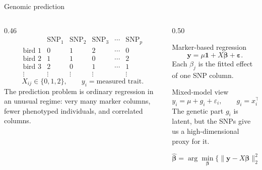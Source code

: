 \documentclass[aspectratio=169]{beamer}
\begin{document}
\begin{frame}{Genomic prediction}
  \begin{columns}[T,onlytextwidth]
    \begin{column}{0.46\textwidth}
      \[
      \begin{array}{c|ccccc}
       & \text{SNP}_1 & \text{SNP}_2 & \text{SNP}_3 & \cdots & \text{SNP}_p\\
      \hline
      \text{bird }1 & 0 & 1 & 2 & \cdots & 0\\
      \text{bird }2 & 1 & 1 & 0 & \cdots & 2\\
      \text{bird }3 & 2 & 0 & 1 & \cdots & 1\\
      \vdots & \vdots & \vdots & \vdots & & \vdots
      \end{array}
      \]
      \[
        X_{ij}\in\{0,1,2\}, \qquad y_i=\text{measured trait}.
      \]
      \small The prediction problem is ordinary regression in an unusual regime: very many marker columns, fewer phenotyped individuals, and correlated columns.
    \end{column}
    \begin{column}{0.50\textwidth}
      \begin{block}{Marker-based regression}
      \[
        \bm{y}=\mu\mathbf{1}+X\bm{\beta}+\bm{\varepsilon}.
      \]
      Each \(\beta_j\) is the fitted effect of one SNP column.
      \end{block}
      \begin{block}{Mixed-model view}
      \[
        y_i=\mu+g_i+\varepsilon_i,\qquad
        g_i=x_i^\top\bm{\beta}.
      \]
      The genetic part \(g_i\) is latent, but the SNPs give us a high-dimensional proxy for it.
      \end{block}
      {\small
      \[
        \hat{\bm{\beta}}=
        \arg\min_{\bm{\beta}}
        \{\|\bm{y}-X\bm{\beta}\|_2^2+\lambda\|\bm{\beta}\|_2^2\}.
      \]
      }
    \end{column}
  \end{columns}
\end{frame}
\end{document}

